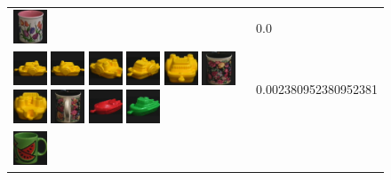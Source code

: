 \begin{figure}[tbp]
\begin{center}
\begin{tabular}{m{11cm} | m{3cm} |}
\includegraphics[width=1cm]{coil/beeld-8.eps}
& {\scriptsize 0.0}
\\
\includegraphics[width=1cm]{coil/beeld-12.eps}
\includegraphics[width=1cm]{coil/beeld-13.eps}
\includegraphics[width=1cm]{coil/beeld-16.eps}
\includegraphics[width=1cm]{coil/beeld-15.eps}
\includegraphics[width=1cm]{coil/beeld-14.eps}
\includegraphics[width=1cm]{coil/beeld-62.eps}
\includegraphics[width=1cm]{coil/beeld-17.eps}
\includegraphics[width=1cm]{coil/beeld-65.eps}
\includegraphics[width=1cm]{coil/beeld-21.eps}
\includegraphics[width=1cm]{coil/beeld-57.eps}
& {\scriptsize 0.002380952380952381}
\\
\includegraphics[width=1cm]{coil/beeld-30.eps}

\end{tabular}
\end{center}
\end{figure}
